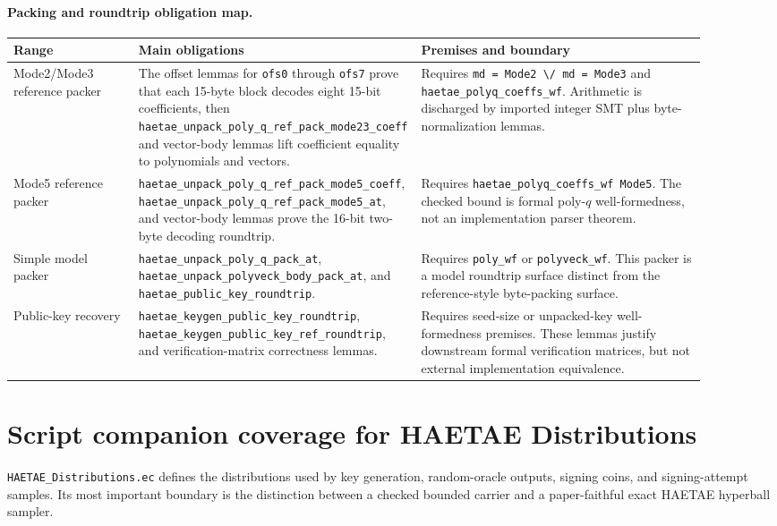 \documentclass[11pt]{report}
\DeclareRobustCommand{\file}[1]{\ifmmode\text{\nolinkurl{#1}}\else\nolinkurl{#1}\fi}
\DeclareRobustCommand{\ec}[1]{\ifmmode\text{\nolinkurl{#1}}\else\nolinkurl{#1}\fi}
\theoremstyle{definition}
\theoremstyle{plain}
\begin{document}
\paragraph{Packing and roundtrip obligation map.}
\begin{longtable}{p{0.18\linewidth}p{0.31\linewidth}p{0.41\linewidth}}
\toprule
\textbf{Range} & \textbf{Main obligations} & \textbf{Premises and boundary} \\
\midrule
Mode2/Mode3 reference packer &
The offset lemmas for \ec{ofs0} through \ec{ofs7} prove that each 15-byte
block decodes eight 15-bit coefficients, then
\ec{haetae\_unpack\_poly\_q\_ref\_pack\_mode23\_coeff} and vector-body lemmas
lift coefficient equality to polynomials and vectors. &
Requires \ec{md = Mode2 \/ md = Mode3} and
\ec{haetae\_polyq\_coeffs\_wf}.  Arithmetic is discharged by imported integer
SMT plus byte-normalization lemmas. \\
\midrule
Mode5 reference packer &
\ec{haetae\_unpack\_poly\_q\_ref\_pack\_mode5\_coeff},
\ec{haetae\_unpack\_poly\_q\_ref\_pack\_mode5\_at}, and vector-body lemmas
prove the 16-bit two-byte decoding roundtrip. &
Requires \ec{haetae\_polyq\_coeffs\_wf Mode5}.  The checked bound is formal
poly-\(q\) well-formedness, not an implementation parser theorem. \\
\midrule
Simple model packer &
\ec{haetae\_unpack\_poly\_q\_pack\_at},
\ec{haetae\_unpack\_polyveck\_body\_pack\_at}, and
\ec{haetae\_public\_key\_roundtrip}. &
Requires \ec{poly\_wf} or \ec{polyveck\_wf}.  This packer is a model
roundtrip surface distinct from the reference-style byte-packing surface. \\
\midrule
Public-key recovery &
\ec{haetae\_keygen\_public\_key\_roundtrip},
\ec{haetae\_keygen\_public\_key\_ref\_roundtrip}, and verification-matrix
correctness lemmas. &
Requires seed-size or unpacked-key well-formedness premises.  These lemmas
justify downstream formal verification matrices, but not external
implementation equivalence. \\
\bottomrule
\end{longtable}

\section{Script companion coverage for HAETAE Distributions}

\file{HAETAE\_Distributions.ec} defines the distributions used by key
generation, random-oracle outputs, signing coins, and signing-attempt samples.
Its most important boundary is the distinction between a checked bounded
carrier and a paper-faithful exact HAETAE hyperball sampler.
\end{document}
